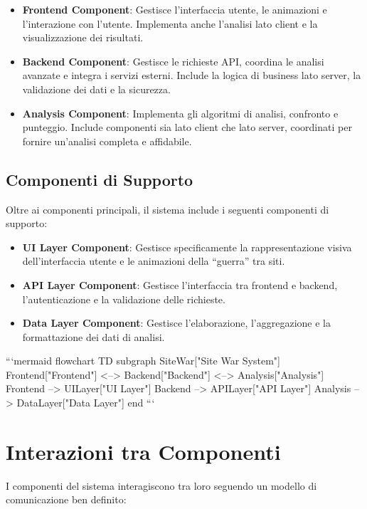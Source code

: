 \begin{itemize}
    \item \textbf{Frontend Component}: Gestisce l'interfaccia utente, le animazioni e l'interazione con l'utente. Implementa anche l'analisi lato client e la visualizzazione dei risultati.
    
    \item \textbf{Backend Component}: Gestisce le richieste API, coordina le analisi avanzate e integra i servizi esterni. Include la logica di business lato server, la validazione dei dati e la sicurezza.
    
    \item \textbf{Analysis Component}: Implementa gli algoritmi di analisi, confronto e punteggio. Include componenti sia lato client che lato server, coordinati per fornire un'analisi completa e affidabile.
\end{itemize}

\subsection{Componenti di Supporto}
Oltre ai componenti principali, il sistema include i seguenti componenti di supporto:

\begin{itemize}
    \item \textbf{UI Layer Component}: Gestisce specificamente la rappresentazione visiva dell'interfaccia utente e le animazioni della ``guerra'' tra siti.
    
    \item \textbf{API Layer Component}: Gestisce l'interfaccia tra frontend e backend, l'autenticazione e la validazione delle richieste.
    
    \item \textbf{Data Layer Component}: Gestisce l'elaborazione, l'aggregazione e la formattazione dei dati di analisi.
\end{itemize}

```mermaid
flowchart TD
    subgraph SiteWar["Site War System"]
        Frontend["Frontend\nComponent"] <--> Backend["Backend\nComponent"] <--> Analysis["Analysis\nComponent"]
        Frontend --> UILayer["UI Layer\nComponent"]
        Backend --> APILayer["API Layer\nComponent"]
        Analysis --> DataLayer["Data Layer\nComponent"]
    end
```

\section{Interazioni tra Componenti}
I componenti del sistema interagiscono tra loro seguendo un modello di comunicazione ben definito:

